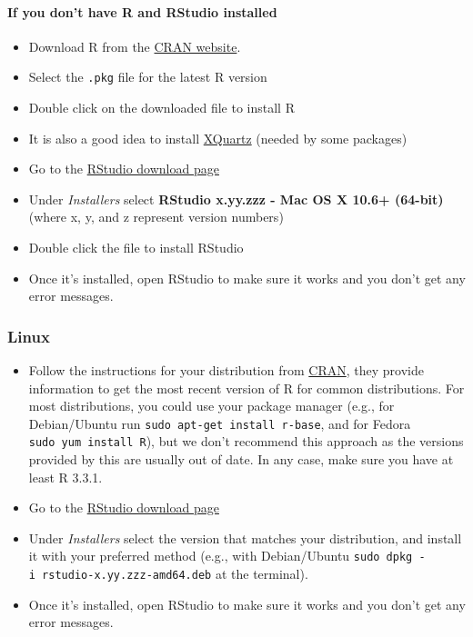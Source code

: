 \documentclass[12pt, krantz2,]{book}
\providecommand{\tightlist}{%
  \setlength{\itemsep}{0pt}\setlength{\parskip}{0pt}}
\let\oldparagraph\paragraph
\renewcommand{\paragraph}[1]{\oldparagraph{#1}\mbox{}}
\theoremstyle{definition}
\theoremstyle{definition}
\theoremstyle{definition}
\newcommand{\1}{\mathbbm{1}}
\begin{document}
\hypertarget{if-you-dont-have-r-and-rstudio-installed-1}{%
\paragraph{If you don't have R and RStudio installed}\label{if-you-dont-have-r-and-rstudio-installed-1}}

\begin{itemize}
\tightlist
\item
  Download R from
  the \href{http://cran.r-project.org/bin/macosx}{CRAN website}.
\item
  Select the \texttt{.pkg} file for the latest R version
\item
  Double click on the downloaded file to install R
\item
  It is also a good idea to install \href{https://www.xquartz.org/}{XQuartz} (needed
  by some packages)
\item
  Go to the \href{https://www.rstudio.com/products/rstudio/download/\#download}{RStudio download
  page}
\item
  Under \emph{Installers} select \textbf{RStudio x.yy.zzz - Mac OS X 10.6+ (64-bit)}
  (where x, y, and z represent version numbers)
\item
  Double click the file to install RStudio
\item
  Once it's installed, open RStudio to make sure it works and you don't get any
  error messages.
\end{itemize}

\hypertarget{linux}{%
\subsubsection{Linux}\label{linux}}

\begin{itemize}
\tightlist
\item
  Follow the instructions for your distribution
  from \href{https://cloud.r-project.org/bin/linux}{CRAN}, they provide information
  to get the most recent version of R for common distributions. For most
  distributions, you could use your package manager (e.g., for Debian/Ubuntu run
  \texttt{sudo\ apt-get\ install\ r-base}, and for Fedora \texttt{sudo\ yum\ install\ R}), but we
  don't recommend this approach as the versions provided by this are
  usually out of date. In any case, make sure you have at least R 3.3.1.
\item
  Go to the \href{https://www.rstudio.com/products/rstudio/download/\#download}{RStudio download
  page}
\item
  Under \emph{Installers} select the version that matches your distribution, and
  install it with your preferred method (e.g., with Debian/Ubuntu \texttt{sudo\ dpkg\ -i\ rstudio-x.yy.zzz-amd64.deb} at the terminal).
\item
  Once it's installed, open RStudio to make sure it works and you don't get any
  error messages.
\end{itemize}
\end{document}
